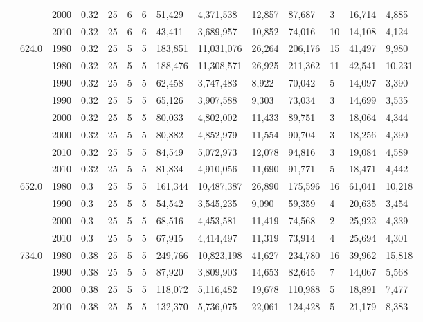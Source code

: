 \begin{table*}[]
\begin{tabular}{|l|l|l|l|l|l|l|l|l|l|l|l|l|l|}
	&  & 2000 & 0.32 & 25 & 6 & 6 & 51,429 & 4,371,538 & 12,857 & 87,687 & 3 & 16,714 & 4,885 \\ \cline{3-14} 
	&  & 2010 & 0.32 & 25 & 6 & 6 & 43,411 & 3,689,957 & 10,852 & 74,016 & 10 & 14,108 & 4,124 \\ \cline{2-14} 
	& \multirow{8}{*}{624.0} & 1980 & 0.32 & 25 & 5 & 5 & 183,851 & 11,031,076 & 26,264 & 206,176 & 15 & 41,497 & 9,980 \\ \cline{3-14} 
	&  & 1980 & 0.32 & 25 & 5 & 5 & 188,476 & 11,308,571 & 26,925 & 211,362 & 11 & 42,541 & 10,231 \\ \cline{3-14} 
	&  & 1990 & 0.32 & 25 & 5 & 5 & 62,458 & 3,747,483 & 8,922 & 70,042 & 5 & 14,097 & 3,390 \\ \cline{3-14} 
	&  & 1990 & 0.32 & 25 & 5 & 5 & 65,126 & 3,907,588 & 9,303 & 73,034 & 3 & 14,699 & 3,535 \\ \cline{3-14} 
	&  & 2000 & 0.32 & 25 & 5 & 5 & 80,033 & 4,802,002 & 11,433 & 89,751 & 3 & 18,064 & 4,344 \\ \cline{3-14} 
	&  & 2000 & 0.32 & 25 & 5 & 5 & 80,882 & 4,852,979 & 11,554 & 90,704 & 3 & 18,256 & 4,390 \\ \cline{3-14} 
	&  & 2010 & 0.32 & 25 & 5 & 5 & 84,549 & 5,072,973 & 12,078 & 94,816 & 3 & 19,084 & 4,589 \\ \cline{3-14} 
	&  & 2010 & 0.32 & 25 & 5 & 5 & 81,834 & 4,910,056 & 11,690 & 91,771 & 5 & 18,471 & 4,442 \\ \cline{2-14} 
	& \multirow{4}{*}{652.0} & 1980 & 0.3 & 25 & 5 & 5 & 161,344 & 10,487,387 & 26,890 & 175,596 & 16 & 61,041 & 10,218 \\ \cline{3-14} 
	&  & 1990 & 0.3 & 25 & 5 & 5 & 54,542 & 3,545,235 & 9,090 & 59,359 & 4 & 20,635 & 3,454 \\ \cline{3-14} 
	&  & 2000 & 0.3 & 25 & 5 & 5 & 68,516 & 4,453,581 & 11,419 & 74,568 & 2 & 25,922 & 4,339 \\ \cline{3-14} 
	&  & 2010 & 0.3 & 25 & 5 & 5 & 67,915 & 4,414,497 & 11,319 & 73,914 & 4 & 25,694 & 4,301 \\ \cline{2-14} 
	& \multirow{4}{*}{734.0} & 1980 & 0.38 & 25 & 5 & 5 & 249,766 & 10,823,198 & 41,627 & 234,780 & 16 & 39,962 & 15,818 \\ \cline{3-14} 
	&  & 1990 & 0.38 & 25 & 5 & 5 & 87,920 & 3,809,903 & 14,653 & 82,645 & 7 & 14,067 & 5,568 \\ \cline{3-14} 
	&  & 2000 & 0.38 & 25 & 5 & 5 & 118,072 & 5,116,482 & 19,678 & 110,988 & 5 & 18,891 & 7,477 \\ \cline{3-14} 
	&  & 2010 & 0.38 & 25 & 5 & 5 & 132,370 & 5,736,075 & 22,061 & 124,428 & 5 & 21,179 & 8,383 \\ \cline{2-14} 

\end{tabular}
\end{table*}
